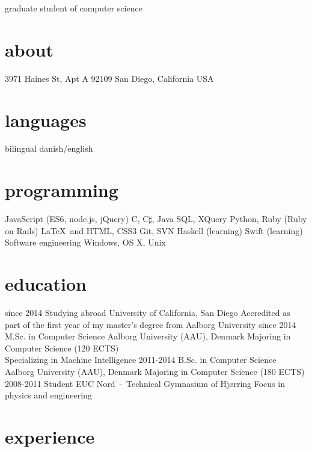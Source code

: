 \documentclass{afriggeri-cv/friggeri-cv}
\newcommand{\aau}{%
  Aalborg University (AAU), Denmark
}
\begin{document}
       {graduate student of computer science}

\begin{aside}
  \section{about}
    3971 Haines St, Apt A
    92109 San Diego, California
    USA
    ~
  \section{languages}
    bilingual danish/english
  \section{programming}
    JavaScript
    (ES6, node.js, jQuery)
    C, C$\sharp$, Java
    SQL, XQuery
    Python, Ruby
    (Ruby on Rails)
    \LaTeX\ and \XeTeX
    HTML, CSS3
    Git, SVN
    Haskell (learning)
    Swift (learning)
    Software engineering
    Windows, OS X, Unix
\end{aside}

\section{education}

\begin{entrylist}
  \entry
    {since 2014}
    {Studying abroad}
    {University of California, San Diego}
    {Accredited as part of the first year of my master's degree from Aalborg University}
  \entry
    {since 2014}
    {M.Sc. {\normalfont in Computer Science}}
    {\aau}
    {Majoring in Computer Science (120 ECTS)\\
    Specializing in Machine Intelligence}
  \entry
    {2011-2014}
    {B.Sc. {\normalfont in Computer Science}}
    {\aau}
    {Majoring in Computer Science (180 ECTS)}
  \entry
    {2008-2011}
    {Student}
    {EUC Nord~-~Technical Gymnasium of Hjørring}
    {Focus in physics and engineering}
\end{entrylist}

\section{experience}
\end{document}
